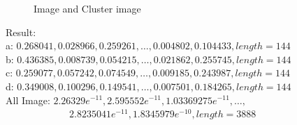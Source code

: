 \documentclass{beamer}
\begin{document}
\begin{frame}
\thispagestyle{empty}
\begin{figure}[H]
\begin{multicols}{2}
\centering
{}

\begin{multicols}{4}



\end{multicols}
\end{multicols}
\caption{Image and Cluster image}
\end{figure}



Result:\\
a: $0.268041, 0.028966, 0.259261, \ldots, 0.004802, 0.104433, length = 144$\\
b: $0.436385, 0.008739, 0.054215, \ldots, 0.021862, 0.255745, length = 144$\\
c: $0.259077, 0.057242, 0.074549, \ldots, 0.009185, 0.243987, length = 144$\\
d: $0.349008, 0.100296, 0.149541, \ldots, 0.007501, 0.184265, length = 144$\\[2ex]

All Image: $2.26329e^{-11}, 2.595552e^{-11}, 1.03369275e^{-11}, \ldots, $\\ \ \ \ \ \ \ \ \ \ \ \ \ \ $2.8235041e^{-11}, 1.8345979e^{-10}, length = 3888$


\end{frame}
\end{document}
